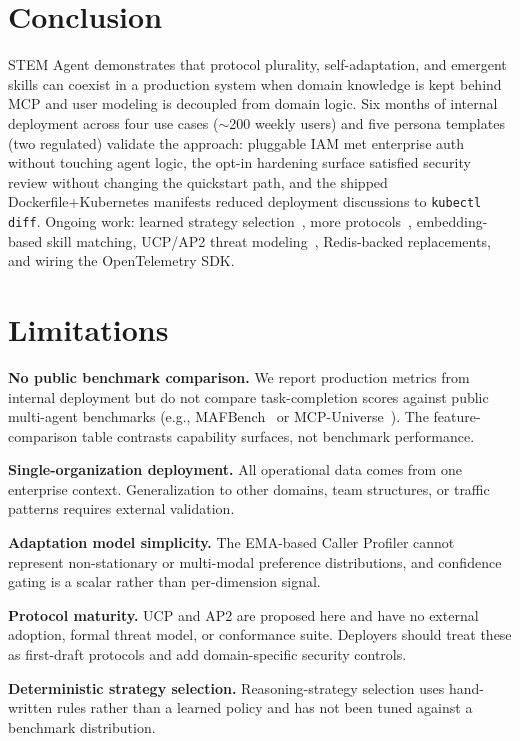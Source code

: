 \documentclass[11pt]{article}
\begin{document}
\section{Conclusion}
\label{sec:conclusion}

STEM Agent demonstrates that protocol plurality, self-adaptation, and emergent skills can coexist in a production system when domain knowledge is kept behind MCP and user modeling is decoupled from domain logic. Six months of internal deployment across four use cases ($\sim$200 weekly users) and five persona templates (two regulated) validate the approach: pluggable IAM met enterprise auth without touching agent logic, the opt-in hardening surface satisfied security review without changing the quickstart path, and the shipped Dockerfile+Kubernetes manifests reduced deployment discussions to \texttt{kubectl diff}. Ongoing work: learned strategy selection~\citep{alomrani2025reasoning}, more protocols~\citep{chang2025anp, nie2026awcp}, embedding-based skill matching, UCP/AP2 threat modeling~\citep{anbiaee2026security}, Redis-backed replacements, and wiring the OpenTelemetry SDK.

\section*{Limitations}

\textbf{No public benchmark comparison.} We report production metrics from internal deployment but do not compare task-completion scores against public multi-agent benchmarks (e.g., MAFBench~\citep{orogat2026mafbench} or MCP-Universe~\citep{luo2025mcpuniverse}). The feature-comparison table contrasts capability surfaces, not benchmark performance.

\textbf{Single-organization deployment.} All operational data comes from one enterprise context. Generalization to other domains, team structures, or traffic patterns requires external validation.

\textbf{Adaptation model simplicity.} The EMA-based Caller Profiler cannot represent non-stationary or multi-modal preference distributions, and confidence gating is a scalar rather than per-dimension signal.

\textbf{Protocol maturity.} UCP and AP2 are proposed here and have no external adoption, formal threat model, or conformance suite. Deployers should treat these as first-draft protocols and add domain-specific security controls.

\textbf{Deterministic strategy selection.} Reasoning-strategy selection uses hand-written rules rather than a learned policy and has not been tuned against a benchmark distribution.
\end{document}
